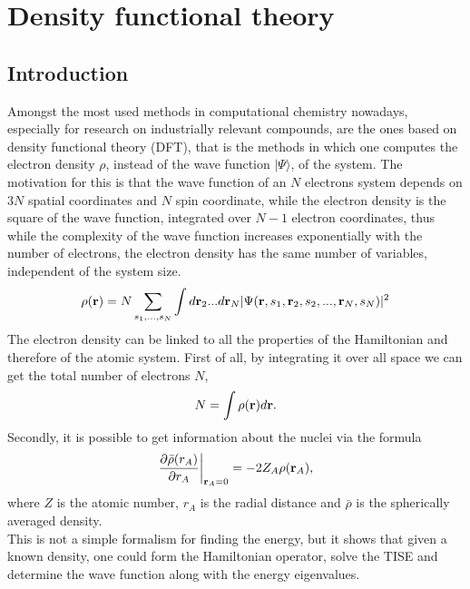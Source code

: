 \chapter{Density functional theory} \label{Density functional theory}

\section{Introduction}
Amongst the most used methods in computational chemistry nowadays, especially for research on industrially relevant compounds, are the ones based on density functional theory (DFT), that is the methods in which one computes the electron density $\rho$, instead of the wave function $|\Psi\rangle$, of the system. The motivation for this is that the wave function of an $N$ electrons system depends on $3N$ spatial coordinates and $N$ spin coordinate, while the electron density is the square of the wave function, integrated over $N-1$ electron coordinates, thus while the complexity of the wave function increases exponentially with the number of electrons, the electron density has the same number of variables, independent of the system size.
\begin{equation}
    \rho({\bf {r}}) = N \sum_{s_1,...,s_N} \int d{\bf r}_2...d{\bf r}_N |\Psi({\bf r},s_1,{\bf r}_2,s_2,...,{\bf r}_N,s_N)|^2
\end{equation}
The electron density can be linked to all the properties of the Hamiltonian and therefore of the atomic system. First of all, by integrating it over all space we can get the total number of electrons $N$,
\begin{equation}
    N = \int \rho({\bf r})d{\bf r}.
\end{equation}
Secondly, it is possible to get information about the nuclei via the formula
\begin{equation}
    \frac{\partial \bar{\rho} (r_A)}{\partial r_A}\bigg|_{{\bf r}_A=0} = -2Z_A \rho({\bf r}_A),
\end{equation}
where $Z$ is the atomic number, $r_A$ is the radial distance and $\bar{\rho}$ is the spherically averaged density. \\
This is not a simple formalism for finding the energy, but it shows that given a known density, one could form the Hamiltonian operator, solve the TISE and determine the wave function along with the energy eigenvalues.

